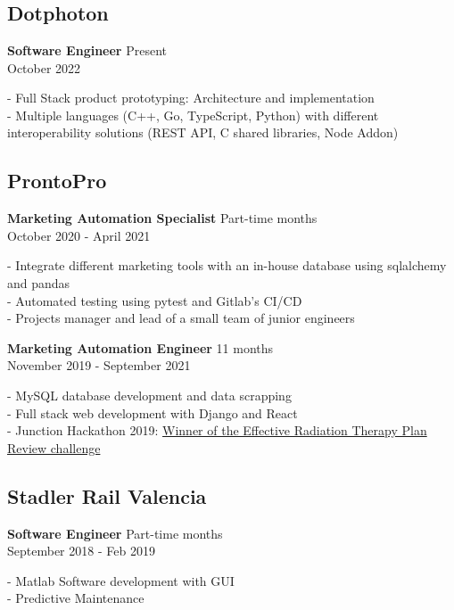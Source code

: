 \section*{\faBriefcase} \label{sec:experience}
 {}

\subsection{Dotphoton}
\textbf{Software Engineer} \hfill Present \\
{\footnotesize October 2022} \\
{
    \raggedright
    - Full Stack product prototyping: Architecture and implementation \\
    - Multiple languages (C++, Go, TypeScript, Python) with different
    interoperability solutions (REST API, C shared libraries, Node Addon) \\
}

\medskip
\subsection{ProntoPro}
\textbf{Marketing Automation Specialist} \hfill Part-time  months \\ 
{\footnotesize October 2020 - April 2021} \\
{
    \raggedright
    - Integrate different marketing tools with an in-house database using
    sqlalchemy and pandas \\
    - Automated testing using pytest and Gitlab's CI/CD \\
    - Projects manager and lead of a small team of junior engineers \\
}

\textbf{Marketing Automation Engineer} \hfill 11 months \\ 
{\footnotesize November 2019 - September 2021} \\
{
    \raggedright
    - MySQL database development and data scrapping \\
    - Full stack web development with Django and React \\
    - Junction Hackathon 2019:
    \href{http://www.upv.es/noticias-upv/noticia-11673-makers-upv-tri-es.html}{Winner
    of the Effective Radiation Therapy Plan Review challenge}\\
}

\medskip
\subsection{Stadler Rail Valencia}
\textbf{Software Engineer} \hfill Part-time  months \\ 
{\footnotesize September 2018 - Feb 2019} \\
{
    \raggedright
    - Matlab Software development with GUI \\
    - Predictive Maintenance \\
}